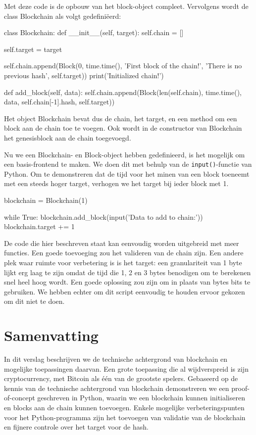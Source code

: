 \documentclass{article}
\begin{document}
Met deze code is de opbouw van het block-object compleet. Vervolgens wordt de class Blockchain als volgt gedefiniëerd:

\begin{python3code}
class Blockchain:
    def __init__(self, target):
        self.chain = []

        self.target = target

        self.chain.append(Block(0, time.time(), 'First block of the chain!',
                                'There is no previous hash', self.target))
        print('Initialized chain!')

    def add_block(self, data):
        self.chain.append(Block(len(self.chain), time.time(), data, 
                                self.chain[-1].hash, self.target))
\end{python3code}	
Het object Blockchain bevat dus de chain, het target, en een method om een block aan de chain toe te voegen. Ook wordt in de constructor van Blockchain het genesisblock aan de chain toegevoegd.

Nu we een Blockchain- en Block-object hebben gedefinieerd, is het mogelijk om een basis-frontend te maken. We doen dit met behulp van de \texttt{input()}-functie van Python. Om te demonstreren dat de tijd voor het minen van een block toeneemt met een steeds hoger target, verhogen we het target bij ieder block met 1.

\begin{python3code}
blockchain = Blockchain(1)

while True:
    blockchain.add_block(input('Data to add to chain:'))
    blockchain.target += 1
\end{python3code}

De code die hier beschreven staat kan eenvoudig worden uitgebreid met meer functies. Een goede toevoeging zou het valideren van de chain zijn. Een andere plek waar ruimte voor verbetering is is het target: een granulariteit van 1 byte lijkt erg laag te zijn omdat de tijd die 1, 2 en 3 bytes benodigen om te berekenen snel heel hoog wordt. Een goede oplossing zou zijn om in plaats van bytes bits te gebruiken. We hebben echter om dit script eenvoudig te houden ervoor gekozen om dit niet te doen. 

\section{Samenvatting}
In dit verslag beschrijven we de technische achtergrond van blockchain en mogelijke toepassingen daarvan. Een grote toepassing die al wijdverspreid is zijn cryptocurrency, met Bitcoin als één van de grootste spelers. Gebaseerd op de kennis van de technische achtergrond van blockchain demonstreren we een proof-of-concept geschreven in Python, waarin we een blockchain kunnen initialiseren en blocks aan de chain kunnen toevoegen. Enkele mogelijke verbeteringspunten voor het Python-programma zijn het toevoegen van validatie van de blockchain en fijnere controle over het target voor de hash.
\end{document}
